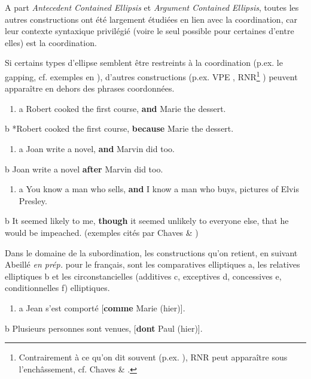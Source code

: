 A part \textit{Antecedent Contained Ellipsis} et \textit{Argument Contained Ellipsis}, toutes les autres constructions ont été largement étudiées en lien avec la coordination, car leur contexte syntaxique privilégié (voire le seul possible pour certaines d'entre elles) est la coordination.

Si certains types d'ellipse semblent être restreints à la coordination (p.ex. le gapping, cf. exemples en ), d'autres constructions (p.ex. VPE , RNR\footnote{Contrairement à ce qu'on dit souvent (p.ex. \citet{Haspelmath2007}), RNR peut apparaître sous l'enchâssement, cf. Chaves \& \citet{Sag2008}.} ) peuvent apparaître en dehors des phrases coordonnées. ~


\begin{enumerate}
\item \label{bkm:Ref306114635}a  Robert cooked the first course, \textbf{and} Marie the dessert. 


\end{enumerate}
  b  *Robert cooked the first course, \textbf{because} Marie the dessert.


\begin{enumerate}
\item \label{bkm:Ref306115008}a  Joan write a novel, \textbf{and} Marvin did too. 


\end{enumerate}
  b  Joan write a novel \textbf{after} Marvin did too.  


\begin{enumerate}
\item \label{bkm:Ref306123939}a  You know a man who sells, \textbf{and} I know a man who buys, pictures of Elvis Presley. 


\end{enumerate}
  b  It seemed likely to me, \textbf{though} it seemed unlikely to everyone else, that he would be impeached.          (exemples cités par Chaves \& \citet{Sag2008})

Dans le domaine de la subordination, les constructions qu'on retient, en suivant Abeillé \textit{en prép.} pour le français, sont les comparatives elliptiques a, les relatives elliptiques b et les circonstancielles (additives c, exceptives d, concessives e, conditionnelles f) elliptiques. 


\begin{enumerate}
\item \label{bkm:Ref306117171}a  Jean s'est comporté [\textbf{comme} Marie (hier)]. 


\end{enumerate}
  b  Plusieurs personnes sont venues, [\textbf{dont} Paul (hier)]. 

